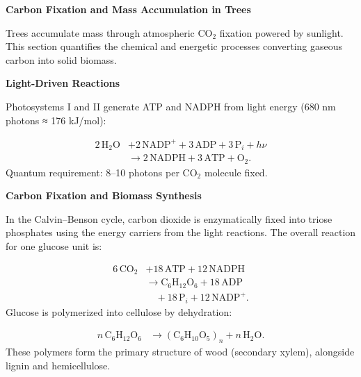 \begin{technical}
{\Large\textbf{Carbon Fixation and Mass Accumulation in Trees}}

\vspace{0.3em}
\noindent Trees accumulate mass through atmospheric $\mathrm{CO}_2$ fixation powered by sunlight. This section quantifies the chemical and energetic processes converting gaseous carbon into solid biomass.\par

\vspace{0.5em}
\noindent\textbf{Light-Driven Reactions}

\vspace{0.2em}
\noindent Photosystems I and II generate ATP and NADPH from light energy (680 nm photons ≈ 176 kJ/mol):\par
\begin{align}
2\,\mathrm{H}_2\mathrm{O} 
&+ 2\,\mathrm{NADP}^+ 
+ 3\,\mathrm{ADP} 
+ 3\,\mathrm{P}_i 
+ h\nu \nonumber \\
&\rightarrow 2\,\mathrm{NADPH} 
+ 3\,\mathrm{ATP} 
+ \mathrm{O}_2.
\end{align}
Quantum requirement: 8–10 photons per $\mathrm{CO}_2$ molecule fixed.\par

\vspace{0.5em}
\noindent\textbf{Carbon Fixation and Biomass Synthesis}

\vspace{0.2em}
\noindent In the Calvin–Benson cycle, carbon dioxide is enzymatically fixed into triose phosphates using the energy carriers from the light reactions. The overall reaction for one glucose unit is:\par
\begin{align}
6\,\mathrm{CO}_2 
&+ 18\,\mathrm{ATP} 
+ 12\,\mathrm{NADPH} \nonumber \\
&\rightarrow \mathrm{C}_6\mathrm{H}_{12}\mathrm{O}_6 
+ 18\,\mathrm{ADP} \nonumber \\
&\quad + 18\,\mathrm{P}_i 
+ 12\,\mathrm{NADP}^+.
\end{align}
Glucose is polymerized into cellulose by dehydration:\par
\begin{align}
n\,\mathrm{C}_6\mathrm{H}_{12}\mathrm{O}_6 
&\rightarrow (\mathrm{C}_6\mathrm{H}_{10}\mathrm{O}_5)_n 
+ n\,\mathrm{H}_2\mathrm{O}.
\end{align}
These polymers form the primary structure of wood (secondary xylem), alongside lignin and hemicellulose.


\end{technical}
